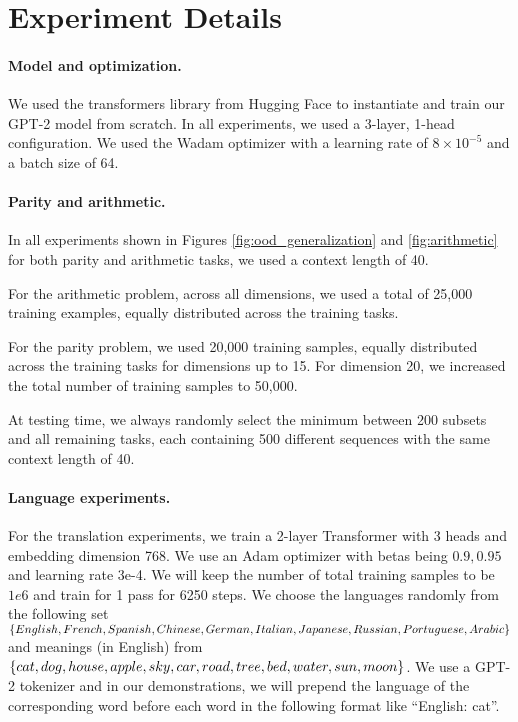 \section{Experiment Details}\label{appendix: experiment details}

\paragraph{Model and optimization.} We used the transformers library from Hugging Face \cite{wolf2020transformers} to instantiate and train our GPT-2 model from scratch. In all experiments, we used a 3-layer, 1-head configuration. We used the Wadam optimizer \cite{kingma2014adam} with a learning rate of $8 \times 10^{-5}$ and a batch size of 64.


\paragraph{Parity and arithmetic.} In all experiments shown in Figures \ref{fig:ood_generalization} and \ref{fig:arithmetic} for both parity and arithmetic tasks, we used a context length of 40. 

For the arithmetic problem, across all dimensions, we used a total of 25,000 training examples, equally distributed across the training tasks. 

For the parity problem, we used 20,000 training samples, equally distributed across the training tasks for dimensions up to 15. For dimension 20, we increased the total number of training samples to 50,000.


At testing time, we always randomly select the minimum between 200 subsets and all remaining tasks, each containing 500 different sequences with the same context length of 40.

\paragraph{Language experiments.} For the translation experiments, we train a 2-layer Transformer with 3 heads and embedding dimension 768. We use an Adam optimizer with betas being $0.9, 0.95$ and learning rate 3e-4. We will keep the number of total training samples to be $1e6$ and train for 1 pass for 6250 steps.  We choose the languages randomly from the following set $\{ English, French, Spanish, Chinese,
        German, Italian, Japanese, Russian,\\
        Portuguese, Arabic \}$ and meanings (in English) from $\{ cat, dog, house, apple, sky, car ,road\\, tree, bed, water, sun, moon\}$.  We use a GPT-2 tokenizer and in our demonstrations, we will prepend the language of the corresponding word before each word in the following format like ``English: cat''.


